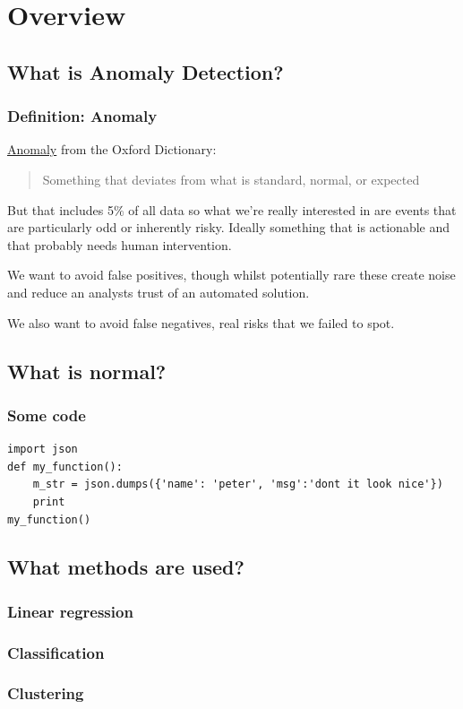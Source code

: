 \documentclass[aspectratio=169]{beamer}
\begin{document}
\section{Overview}
\subsection{What is Anomaly Detection?}
\begin{frame}
\frametitle{Definition: Anomaly}
\href{http://www.oxforddictionaries.com/definition/english/anomaly}{Anomaly} from the Oxford Dictionary:
\begin{quote}
	Something that deviates from what is standard, normal, or expected
\end{quote}
But that includes 5$\%$ of all data so what we're really interested in are events that 
are particularly odd or inherently risky. Ideally something that is actionable and that 
probably needs human intervention.

We want to avoid false positives, though whilst potentially rare these create noise and reduce an analysts trust of an automated solution. 

We also want to avoid false negatives, real risks that we failed to spot.  
\end{frame}

\subsection{What is normal?}
\begin{frame}[fragile]
\frametitle{Some code}
\begin{lstlisting}
import json
def my_function():
	m_str = json.dumps({'name': 'peter', 'msg':'dont it look nice'})
	print 
my_function()
\end{lstlisting}
\cite{data:yahoo}
\end{frame}

\subsection{What methods are used?}
\subsubsection{Linear regression}
\subsubsection{Classification}
\subsubsection{Clustering}
\end{document}
